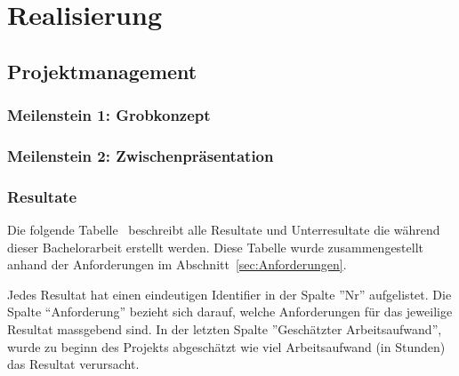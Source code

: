 \chapter{Realisierung}


\section{Projektmanagement}

\subsection{Meilenstein 1: Grobkonzept}

\subsection{Meilenstein 2: Zwischenpräsentation}

\subsection{Resultate}

Die folgende Tabelle~ beschreibt alle Resultate und Unterresultate die während dieser Bachelorarbeit erstellt werden.
Diese Tabelle wurde zusammengestellt anhand der Anforderungen im Abschnitt~\ref{sec:Anforderungen}.

Jedes Resultat hat einen eindeutigen Identifier in  der Spalte ''Nr'' aufgelistet.
Die Spalte ``Anforderung'' bezieht sich darauf, welche Anforderungen für das jeweilige Resultat massgebend sind.
In der letzten Spalte ''Geschätzter Arbeitsaufwand'', wurde zu beginn des Projekts abgeschätzt wie viel Arbeitsaufwand (in Stunden) das Resultat verursacht.

